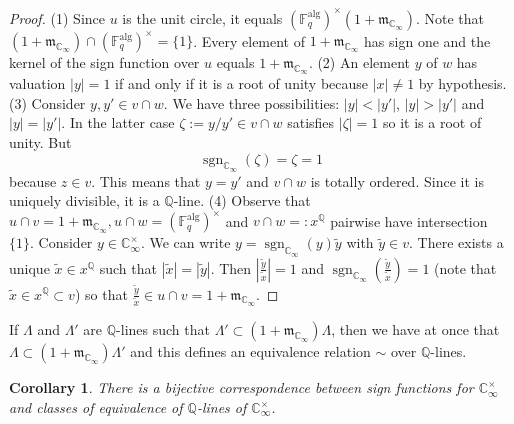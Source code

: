 \documentclass[11pt]{amsart}
\numberwithin{equation}{section}
\newcommand{\FF}{\mathbb{F}}
\newcommand{\CC}{\mathbb{C}}
\newcommand{\QQ}{\mathbb{Q}}
\newcommand{\sgn}{\operatorname{sgn}}
\newtheorem{Corollary}[Theorem]{Corollary}
\begin{document}
\begin{proof}
(1) Since $u$ is the unit circle, it equals $(\FF^{\text{alg}}_q)^\times (1+\mathfrak{m}_{\CC_\infty})$. 
Note that $(1+\mathfrak{m}_{\CC_\infty})\cap (\FF^{\text{alg}}_q)^\times=\{1\}$. 
Every element of $1+\mathfrak{m}_{\CC_\infty}$ has sign one and the kernel of the sign function over 
$u$ equals $1+\mathfrak{m}_{\CC_\infty}$. (2) An element $y$ of
$w$ has valuation $|y|=1$ if and only if it is a root of unity because $|x|\neq1$ by hypothesis. (3) Consider $y,y'\in v\cap w$.
We have three possibilities: $|y|<|y'|$, $|y|>|y'|$ and $|y|=|y'|$. In the latter case $\zeta:=y/y'\in v\cap w$ satisfies $|\zeta|=1$ so it is a root of unity. But $$\sgn_{\CC_\infty}(\zeta)=\zeta=1$$
 because $z\in v$. This means that $y=y'$ and $v\cap w$ is totally ordered. Since it is uniquely divisible, it is a $\QQ$-line. (4) Observe that $u\cap v=1+\mathfrak{m}_{\CC_\infty},u\cap w=(\FF^{\text{alg}}_q)^\times$ and $v\cap w=:x^\QQ$ pairwise have intersection $\{1\}$. Consider $y\in\CC_\infty^\times$. We can write
$y=\sgn_{\CC_\infty}(y)\tilde{y}$ with $\tilde{y}\in v$. There exists a unique $\tilde{x}\in x^\QQ$ such that $|\tilde{x}|=|\tilde{y}|$.
Then $|\frac{\tilde{y}}{\tilde{x}}|=1$ and $\sgn_{\CC_\infty}(\frac{\tilde{y}}{\tilde{x}})=1$ (note that $\tilde{x}\in x^\QQ\subset v$) so that $\frac{\tilde{y}}{\tilde{x}}\in u\cap v=1+\mathfrak{m}_{\CC_\infty}$.
\end{proof}

If $\Lambda$ and $\Lambda'$ are $\QQ$-lines such that $\Lambda'\subset(1+\mathfrak{m}_{\CC_\infty})\Lambda$, then 
we have at once that $\Lambda\subset(1+\mathfrak{m}_{\CC_\infty})\Lambda'$ and this defines an equivalence relation $\sim$ over
$\QQ$-lines.
 
\begin{Corollary}
There is a bijective correspondence between sign functions for $\CC_\infty^\times$ and classes of equivalence of $\QQ$-lines of $\CC_\infty^\times$.
\end{Corollary}
\end{document}
